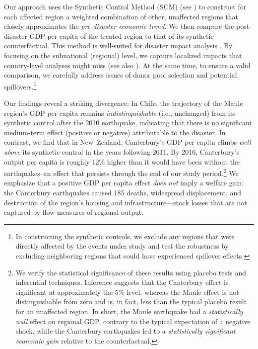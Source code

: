 \documentclass[12pt]{article}
\begin{document}
Our approach uses the Synthetic Control Method (SCM) (see \cite{abadie2021jel, abadie2010synthetic}) to construct for each affected region a weighted combination of other, unaffected regions that closely approximates the \textit{pre-disaster economic trend}. We then compare the post-disaster GDP per capita of the treated region to that of its synthetic counterfactual. This method is well-suited for disaster impact analysis \parencite{barone2014natural, coffman2012hurricane, rayamajhee2024shock}. By focusing on the subnational (regional) level, we capture localized impacts that country-level analyses might miss (see also \cite{boustan2020effect, farzanegan2025bam}). At the same time, to ensure a valid comparison, we carefully address issues of donor pool selection and potential spillovers.\footnote{In constructing the synthetic controls, we exclude any regions that were directly affected by the events under study and test the robustness by excluding neighboring regions that could have experienced spillover effects \parencite{abadie2010synthetic, abadie2021jel}}

Our findings reveal a striking divergence: In Chile, the trajectory of the Maule region's GDP per capita remains \textit{indistinguishable} (i.e., unchanged) from its synthetic control after the 2010 earthquake, indicating that there is no significant medium-term effect (positive or negative) attributable to the disaster. In contrast, we find that in New Zealand, Canterbury’s GDP per capita climbs \textit{well above} its synthetic control in the years following 2011. By 2016, Canterbury’s output per capita is roughly 12\% higher than it would have been without the earthquakes--an effect that persists through the end of our study period.\footnote{We verify the statistical significance of these results using placebo tests and inferential techniques. Inference suggests that the Canterbury effect is significant at approximately the 5\% level, whereas the Maule effect is not distinguishable from zero and is, in fact, less than the typical placebo result for an unaffected region. In short, the Maule earthquake had a \emph{statistically null} effect on regional GDP, contrary to the typical expectation of a negative shock, while the Canterbury earthquakes led to a \emph{statistically significant economic gain} relative to the counterfactual.} We emphasize that a positive GDP per capita effect \textit{does not} imply a welfare gain: the Canterbury earthquakes caused 185 deaths, widespread displacement, and destruction of the region's housing and infrastructure—stock losses that are not captured by flow measures of regional output. 
\end{document}
